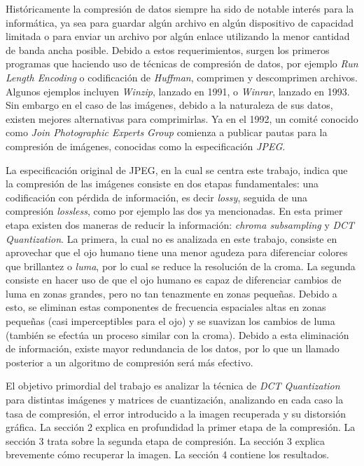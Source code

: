 \documentclass[%
final,
%
reprint,
%
notitlepage,
narroweqnarray,
inline,
twoside,
invited
]{ieee}
\begin{document}
\par Históricamente la compresión de datos siempre ha sido de notable interés para la informática,  
ya sea para guardar algún archivo en algún dispositivo de capacidad limitada o para enviar un 
archivo por algún enlace utilizando la menor cantidad de banda ancha posible.
 Debido a estos requerimientos, surgen los primeros programas que haciendo uso de técnicas de compresión de datos, 
 por ejemplo \textit{Run Length Encoding} o 
codificación de \textit{Huffman}, comprimen y descomprimen archivos. Algunos ejemplos incluyen 
\textit{Winzip}, lanzado en 1991, o \textit{Winrar}, lanzado en 1993. Sin embargo en el caso de las imágenes, 
debido a la naturaleza de sus datos, existen mejores alternativas para comprimirlas. Ya en el 1992, 
un comité conocido como \textit{Join Photographic Experts Group} comienza a publicar pautas 
para la compresión de imágenes, conocidas como la especificación \textit{JPEG}. 
\par La especificación original de JPEG, en la cual se centra este trabajo, indica que la compresión de las 
imágenes consiste en dos etapas fundamentales: una codificación con pérdida de información, es decir \textit{lossy}, 
seguida de una compresión \textit{lossless}, como por ejemplo las dos ya mencionadas. En esta primer etapa 
existen dos maneras de reducir la información: \textit{chroma subsampling} y \textit{DCT Quantization}. La primera, 
la cual no es analizada en este trabajo, consiste en aprovechar que el ojo humano tiene una menor agudeza 
para diferenciar colores que brillantez o \textit{luma}, por lo cual se reduce la resolución de la croma. La segunda 
consiste en hacer uso de que el ojo humano es capaz de diferenciar cambios de 
luma en zonas grandes, pero no tan tenazmente en zonas pequeñas. Debido a esto, se eliminan estas componentes 
de frecuencia espaciales altas en zonas pequeñas (casi imperceptibles para el ojo) y se suavizan los 
cambios de luma (también se efectúa un proceso similar con la croma). Debido a esta eliminación de información, 
existe mayor redundancia de los datos, por lo que un llamado posterior a un algoritmo de compresión será más 
efectivo.
\par El objetivo primordial del trabajo es analizar la técnica de \textit{DCT Quantization} para distintas 
imágenes y matrices de cuantización, analizando en cada caso la tasa de compresión, el error introducido a la 
imagen recuperada y su distorsión gráfica. La sección 2 explica en profundidad la primer etapa de la compresión. 
La sección 3 trata sobre la segunda etapa de compresión. La sección 3 explica brevemente cómo recuperar 
la imagen. La sección 4 contiene los resultados.
\end{document}
